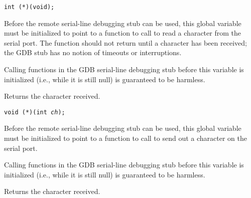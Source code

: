\label{gdb-serial-recv}
\begin{apisyn}

	{\tt int (*)(void);}
\end{apisyn}
\begin{apidesc}
	Before the remote serial-line debugging stub can be used,
	this global variable must be initialized
	to point to a function to call
	to read a character from the serial port.
	The function should not return until a character has been received;
	the GDB stub has no notion of timeouts or interruptions.

	Calling functions in the GDB serial-line debugging stub
	before this variable is initialized
	(i.e., while it is still null)
	is guaranteed to be harmless.
\end{apidesc}
\begin{apiret}
	Returns the character received.
\end{apiret}

\label{gdb-serial-send}
\begin{apisyn}

	{\tt void (*)(int \emph{ch});}
\end{apisyn}
\begin{apidesc}
	Before the remote serial-line debugging stub can be used,
	this global variable must be initialized
	to point to a function to call
	to send out a character on the serial port.

	Calling functions in the GDB serial-line debugging stub
	before this variable is initialized
	(i.e., while it is still null)
	is guaranteed to be harmless.
\end{apidesc}
\begin{apiret}
	Returns the character received.
\end{apiret}

